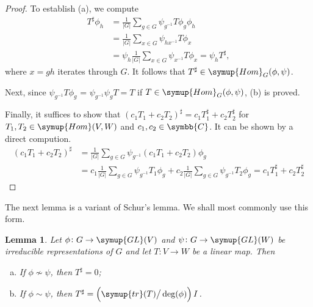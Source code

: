 \documentclass{assignment}[2019/10/15]
\theoremstyle{plain}
\newtheorem{lemma}[theorem]{Lemma}
\newcommand{\BC}{\symbb{C}}
\newcommand{\Hom}{\mathop{}\!\symup{Hom}}
\newcommand{\GL}{\mathop{}\!\symup{GL}}
\newcommand{\tr}{\mathop{}\!\symup{tr}}
\numberwithin{equation}{section}
\begin{document}
    \begin{proof}
        To establish (a), we compute
        \begin{equation}
            \begin{aligned}
                T^\sharp\phi_h &= \frac{1}{|G|}\sum_{g\in G}\psi_{g^{-1}}T\phi_g\phi_h\\
                &= \frac{1}{|G|}\sum_{x\in G}\psi_{hx^{-1}}T\phi_x\\
                &= \psi_h\frac{1}{|G|}\sum_{x\in G}\psi_{x^{-1}}T\phi_x = \psi_hT^\sharp,
            \end{aligned}
        \end{equation}
        where $x=gh$ iterates through $G$. It follows that $T^\sharp\in\Hom_G(\phi, \psi)$.

        Next, since $\psi_{g^{-1}}T\phi_g$ = $\psi_{g^{-1}}\psi_gT = T$ if $T\in \Hom_G(\phi, \psi)$, (b) is proved.

        Finally, it suffices to show that $(c_1T_1+c_2T_2)^\sharp=c_1T_1^\sharp + c_2T_2^\sharp$ for $T_1, T_2\in \Hom(V, W)$ and $c_1, c_2\in\BC$. It can be shown by a direct compution.
        \begin{equation}
            \begin{aligned}
                (c_1T_1+c_2T_2)^\sharp &= \frac{1}{|G|}\sum_{g\in G}\psi_{g^{-1}}(c_1T_1+c_2T_2)\phi_g\\
                &= c_1\frac{1}{|G|}\sum_{g\in G}\psi_{g^{-1}}T_1\phi_g + c_2\frac{1}{|G|}\sum_{g\in G}\psi_{g^{-1}}T_2\phi_g=c_1T_1^\sharp + c_2T_2^\sharp
            \end{aligned}
        \end{equation}
    \end{proof}

    The next lemma is a variant of Schur's lemma. We shall most commonly use this form.

    \begin{lemma}
        Let $\phi\colon G\to\GL(V)$ and $\psi\colon G\to\GL(W)$ be irreducible representations of $G$ and let $T\colon V\to W$ be a linear map. Then
        \begin{enumerate}[(a)]
            \item If $\phi\nsim\psi$, then $T^\sharp = 0$;
            \item If $\phi\sim\psi$, then $T^\sharp = \left(\tr(T)\big/\deg(\phi)\right)I$.
        \end{enumerate}
    \end{lemma}
\end{document}
